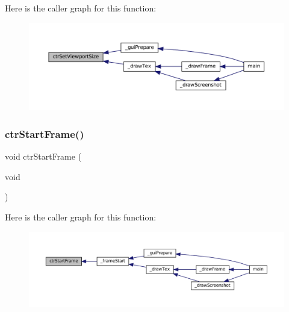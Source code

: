Here is the caller graph for this function\+:
\nopagebreak
\begin{figure}[H]
\begin{center}
\leavevmode
\includegraphics[width=350pt]{ctr-gpu_8c_a10edf7402a10780992aef77c359f99b4_icgraph}
\end{center}
\end{figure}
\mbox{\label{ctr-gpu_8c_a862d2bcd425f4872ebfd58274e948057}} 
\subsubsection{\texorpdfstring{ctr\+Start\+Frame()}{ctrStartFrame()}}
{\footnotesize\ttfamily void ctr\+Start\+Frame (\begin{DoxyParamCaption}\item[{void}]{ }\end{DoxyParamCaption})}

Here is the caller graph for this function\+:
\nopagebreak
\begin{figure}[H]
\begin{center}
\leavevmode
\includegraphics[width=350pt]{ctr-gpu_8c_a862d2bcd425f4872ebfd58274e948057_icgraph}
\end{center}
\end{figure}
\mbox{\label{ctr-gpu_8c_ae1021d5113537160c2b2122305ac6980}} 
